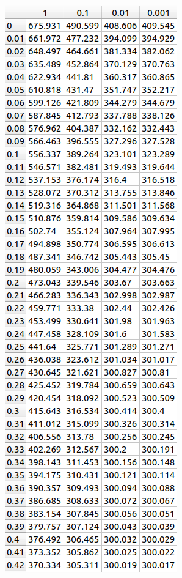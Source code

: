 \documentclass[a4paper,oneside,12pt]{extreport}
\begin{document}
\begin{enumerate}
\begin{figure}[H]
		\includegraphics[height=0.5\textheight]{inc/img/steptau10.png}
		\hspace{1cm}

\end{figure}
\end{enumerate}
\end{document}
